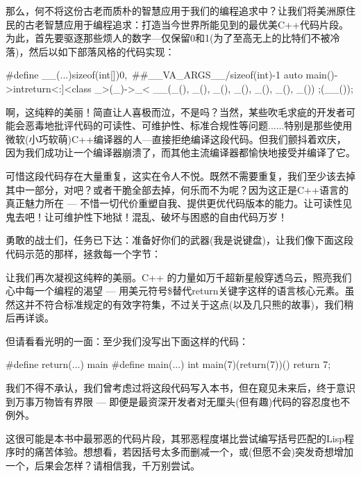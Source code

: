 那么，何不将这份古老而质朴的智慧应用于我们的编程追求中？让我们将美洲原住民的古老智慧应用于编程追求：打造当今世界所能见到的最优美C++代码片段。为此，首先要驱逐那些烦人的数字---仅保留0和1(为了至高无上的比特们不被冷落)，然后以如下部落风格的代码实现：

\begin{cpp}
#define __(...)sizeof(int[]){0,\
                            ##__VA_ARGS__}/sizeof(int)-1
  auto main()->int{return<:]<class _>(_)->_<%
  __(_(), _(), _(), _(), _(), _(), _()) ;}(__());%
\end{cpp}

啊，这纯粹的美丽！简直让人喜极而泣，不是吗？当然，某些吹毛求疵的开发者可能会恶毒地批评代码的可读性、可维护性、标准合规性等问题......特别是那些使用微软(小巧软萌)C++编译器的人---直接拒绝编译这段代码。但我们颤抖着欢庆，因为我们成功让一个编译器崩溃了，而其他主流编译器都愉快地接受并编译了它。

可惜这段代码存在大量重复，这实在令人不悦。既然不需要重复，我们至少该去掉其中一部分，对吧？或者干脆全部去掉，何乐而不为呢？因为这正是C++语言的真正魅力所在 --- 不惜一切代价重塑自我、提供更优代码版本的能力。让可读性见鬼去吧！让可维护性下地狱！混乱、破坏与困惑的自由代码万岁！

勇敢的战士们，任务已下达：准备好你们的武器(我是说键盘)，让我们像下面这段代码示范的那样，拯救每一个字节：


让我们再次凝视这纯粹的美丽。C++ 的力量如万千超新星般穿透乌云，照亮我们心中每一个编程的渴望 --- 用美元符号\$替代return关键字这样的语言核心元素。虽然这并不符合标准规定的有效字符集，不过关于这点(以及几只熊的故事)，我们稍后再详谈。

但请看看光明的一面：至少我们没写出下面这样的代码：

\begin{cpp}
#define return(...) main
#define main(...) int
main(7)(return(7))(){
  return 7;
}
\end{cpp}

我们不得不承认，我们曾考虑过将这段代码写入本书，但在窥见未来后，终于意识到万事万物皆有界限 --- 即便是最资深开发者对无厘头(但有趣)代码的容忍度也不例外。

这很可能是本书中最邪恶的代码片段，其邪恶程度堪比尝试编写括号匹配的Lisp程序时的痛苦体验。想想看，若因括号太多而删减一个，或(但愿不会)突发奇想增加一个，后果会怎样？请相信我，千万别尝试。

